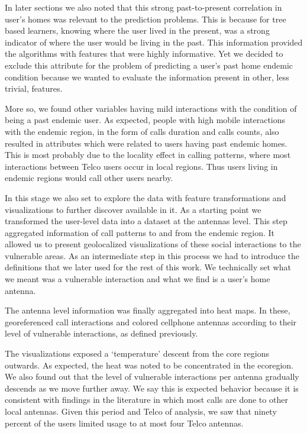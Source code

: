 In later sections we also noted that this strong past-to-present correlation in user's homes was relevant to the prediction problems.
This is because for tree based learners, knowing where the user lived in the present, was a strong indicator of where the user would be living in the past.
This information provided the algorithms with features that were highly informative.
Yet we decided to exclude this attribute for the problem of predicting a user's past home endemic condition because we wanted to evaluate the information present in other, less trivial, features.

More so, we found other variables having mild interactions with the condition of being a past endemic user.
As expected, people with high mobile interactions with the endemic region, in the form of calls duration and calls counts, also resulted in attributes which were related to users having past endemic homes.
This is most probably due to the locality effect in calling patterns, where most interactions between Telco users occur in local regions.
Thus users living in endemic regions would call other users nearby.



In this stage we also set to explore the data with feature transformations and visualizations to further discover available in it. %
As a starting point we transformed the user-level data into a dataset at the antennas level.
This step aggregated information of call patterns to and from the endemic region.
It allowed us to present geolocalized visualizations of these social interactions to the vulnerable areas.
As an intermediate step in this process we had to introduce the definitions that we later used for the rest of this work.
We technically set what we meant was a vulnerable interaction and what we find is a user's home antenna.


The antenna level information was finally aggregated into heat maps.
In these, georeferenced call interactions and colored cellphone antennas according to their level of vulnerable interactions, as defined previously.

The visualizations exposed a `temperature' descent from the core regions outwards.
As expected, the heat was noted to be concentrated in the ecoregion.
We also found out that the level of vulnerable interactions per antenna gradually descends as we move further away.
We say this is expected behavior because it is consistent with findings in the literature in which most calls are done to other local antennas. %
Given this period and Telco of analysis, we saw that ninety percent of the users limited usage to at most four Telco antennas.

